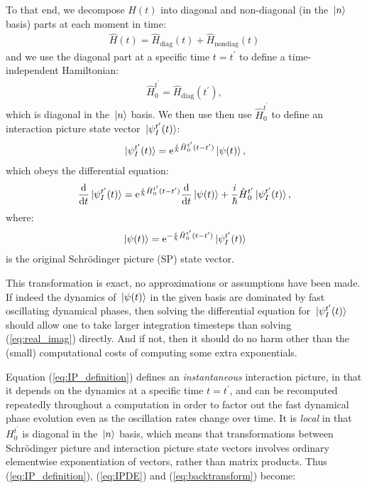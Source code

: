 To that end, we decompose $H(t)$ into diagonal and non-diagonal (in the $\ket{n}$ basis) parts at each moment in time:
\begin{align}
\hat H(t) = \hat H_{\mathrm{diag}}(t) + \hat H_{\mathrm{nondiag}}(t)
\end{align}
and we use the diagonal part at a specific time $t=t^\prime$ to define a time-independent Hamiltonian:
\begin{align}\label{eq:H0def}
 \hat H_0^{t^\prime} = \hat H_{\mathrm{diag}}(t^\prime),
\end{align}
which is diagonal in the $\ket{n}$ basis. We then use then use $\hat H_0^{t^\prime}$ to define an interaction picture state vector $\ket{\psi_I^{t^\prime}(t)}$:
\begin{align}\label{eq:IP_definition}
\ket{\psi_I^{t^\prime}(t)} = \e^{\frac i \hbar \hat H_0^{t^\prime}(t - t^\prime)}\ket{\psi(t)},
\end{align}
which obeys the differential equation:
\begin{align}\label{eq:IPDE}
\dv t \ket{\psi_I^{t^\prime}(t)}
    = \e^{\frac i \hbar \hat H_0^{t^\prime}(t - t^\prime)}\dv t \ket{\psi(t)}
      + \frac i\hbar \hat H_0^{t^\prime}\ket{\psi_I^{t^\prime}(t)},
\end{align}
where:
\begin{align}\label{eq:backtransform}
\ket{\psi(t)} = \e^{-\frac i \hbar \hat H_0^{t^\prime}(t - t^\prime)}\ket{\psi_I^{t^\prime}(t)}
\end{align}
is the original Schrödinger picture (SP) state vector.

This transformation is exact, no approximations or assumptions have been made. If indeed the dynamics of $\ket{\psi(t)}$ in the given basis are dominated by fast oscillating dynamical phases, then solving the differential equation for $\ket{\psi_I^{t^\prime}(t)}$ should allow one to take larger integration timesteps than solving (\ref{eq:real_imag}) directly. And if not, then it should do no harm other than the (small) computational costs of computing some extra exponentials.

Equation (\ref{eq:IP_definition}) defines an \emph{instantaneous} interaction picture, in that it depends on the dynamics at a specific time $t=t^\prime$, and can be recomputed repeatedly throughout a computation in order to factor out the fast dynamical phase evolution even as the oscillation rates change over time. It is \emph{local} in that $H_0^{t^\prime}$ is diagonal in the $\ket{n}$ basis, which means that transformations between Schrödinger picture and interaction picture state vectors involves ordinary elementwise exponentiation of vectors, rather than matrix products. Thus (\ref{eq:IP_definition}), (\ref{eq:IPDE}) and (\ref{eq:backtransform}) become:

